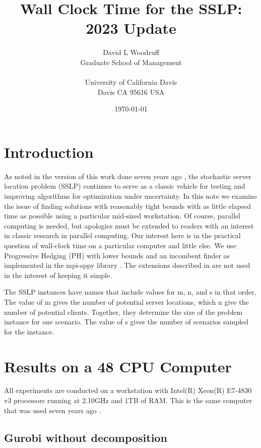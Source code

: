 \documentclass{article}
\title{Wall Clock Time for the SSLP: 2023 Update}
\author{  David L Woodruff\\
  Graduate School of Management\\
  \\
  University of California Davis\\
  Davis CA 95616 USA}
\date{\today}
\begin{document}
\maketitle


\section{Introduction}

As noted in the version of this work done seven years ago \cite{sslpfortime}, the stochastic server location problem (SSLP) \cite{sslp} continues to serve as a classic vehicle
for testing and improving algorithms for optimization under uncertainty. In this note we
examine the issue of finding solutions with reasonably tight bounds with as little elapsed
time as possible using a particular mid-sized workstation. Of course, parallel computing is needed, but apologies must be extended
to readers with an interest in classic research in parallel computing. Our interest here is
in the practical question of wall-clock time on a particular computer and little else.
We use Progressive Hedging (PH) \cite{ph} with lower bounds \cite{gadeetal16} 
and an incombent finder as implemented in the mpi-sppy library \cite{mpi-sppy}.
 The extensions described in \cite{WW} are not used in the interest of keeping it simple.

The SSLP instances have names that include values for m, n, and s in that order. The value
of m gives the number of potential server locations, which n give the number of potential
clients. Together, they determine the size of the problem instance for one scenario. The
value of s gives the number of scenarios sampled for the instance.

\section{Results on a 48 CPU Computer}

All experiments are conducted on a workstation with  Intel(R) Xeon(R) E7-4830 v3 processors running at 2.10GHz
and 1TB of RAM.  This is the same computer that was used seven years ago \cite{sslpfortime}.

\subsection{Gurobi without decomposition}
\end{document}

